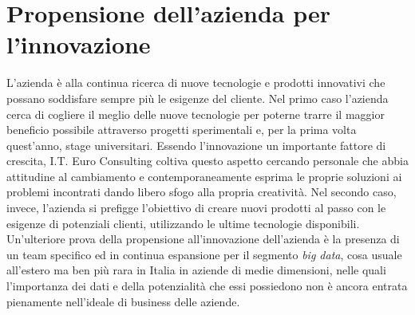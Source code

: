 \section{Propensione dell'azienda per l'innovazione}
L’azienda è alla continua ricerca di nuove tecnologie e prodotti innovativi che possano soddisfare sempre più le esigenze del cliente. Nel primo caso l’azienda cerca di cogliere il meglio delle nuove tecnologie per poterne trarre il maggior beneficio possibile attraverso progetti sperimentali e, per la prima volta quest’anno, stage universitari. Essendo l’innovazione un importante fattore di crescita, I.T. Euro Consulting coltiva questo aspetto cercando personale che abbia attitudine al cambiamento e contemporaneamente esprima le proprie soluzioni ai problemi incontrati dando libero sfogo alla propria creatività. Nel secondo caso, invece, l’azienda si prefigge l’obiettivo di creare nuovi prodotti al passo con le esigenze di potenziali clienti, utilizzando le ultime tecnologie disponibili.\\
Un'ulteriore prova della propensione all'innovazione dell'azienda è la presenza di un team specifico ed in continua espansione per il segmento \textit{big data}, cosa usuale all'estero ma ben più rara in Italia in aziende di medie dimensioni, nelle quali l'importanza dei dati e della potenzialità che essi possiedono non è ancora entrata pienamente nell'ideale di business delle aziende.

